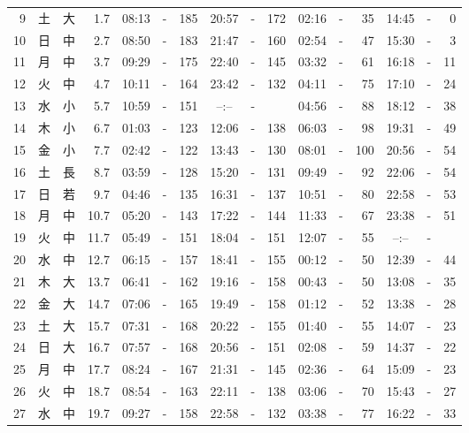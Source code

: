 \documentclass[12pt.a4j]{jsarticle}
\begin{document}
\begin{center}
\begin{table}[ht]
\begin{tabular}{|rc|cr|ccrccr|ccrccr|}
 9 & 土 & 大 &  1.7 &  08:13 &-& 185  &  20:57 &-& 172  &   02:16 &-&  35  &   14:45 &-&   0  \\
10 & 日 & 中 &  2.7 &  08:50 &-& 183  &  21:47 &-& 160  &   02:54 &-&  47  &   15:30 &-&   3  \\
11 & 月 & 中 &  3.7 &  09:29 &-& 175  &  22:40 &-& 145  &   03:32 &-&  61  &   16:18 &-&  11  \\
12 & 火 & 中 &  4.7 &  10:11 &-& 164  &  23:42 &-& 132  &   04:11 &-&  75  &   17:10 &-&  24  \\
13 & 水 & 小 &  5.7 &  10:59 &-& 151  &  --:-- &-&     &   04:56 &-&  88  &   18:12 &-&  38  \\
14 & 木 & 小 &  6.7 &  01:03 &-& 123  &  12:06 &-& 138  &   06:03 &-&  98  &   19:31 &-&  49  \\
15 & 金 & 小 &  7.7 &  02:42 &-& 122  &  13:43 &-& 130  &   08:01 &-& 100  &   20:56 &-&  54  \\
16 & 土 & 長 &  8.7 &  03:59 &-& 128  &  15:20 &-& 131  &   09:49 &-&  92  &   22:06 &-&  54  \\
17 & 日 & 若 &  9.7 &  04:46 &-& 135  &  16:31 &-& 137  &   10:51 &-&  80  &   22:58 &-&  53  \\
18 & 月 & 中 & 10.7 &  05:20 &-& 143  &  17:22 &-& 144  &   11:33 &-&  67  &   23:38 &-&  51  \\
19 & 火 & 中 & 11.7 &  05:49 &-& 151  &  18:04 &-& 151  &   12:07 &-&  55  &   --:-- &-&     \\
20 & 水 & 中 & 12.7 &  06:15 &-& 157  &  18:41 &-& 155  &   00:12 &-&  50  &   12:39 &-&  44  \\
21 & 木 & 大 & 13.7 &  06:41 &-& 162  &  19:16 &-& 158  &   00:43 &-&  50  &   13:08 &-&  35  \\
22 & 金 & 大 & 14.7 &  07:06 &-& 165  &  19:49 &-& 158  &   01:12 &-&  52  &   13:38 &-&  28  \\
23 & 土 & 大 & 15.7 &  07:31 &-& 168  &  20:22 &-& 155  &   01:40 &-&  55  &   14:07 &-&  23  \\
24 & 日 & 大 & 16.7 &  07:57 &-& 168  &  20:56 &-& 151  &   02:08 &-&  59  &   14:37 &-&  22  \\
25 & 月 & 中 & 17.7 &  08:24 &-& 167  &  21:31 &-& 145  &   02:36 &-&  64  &   15:09 &-&  23  \\
26 & 火 & 中 & 18.7 &  08:54 &-& 163  &  22:11 &-& 138  &   03:06 &-&  70  &   15:43 &-&  27  \\
27 & 水 & 中 & 19.7 &  09:27 &-& 158  &  22:58 &-& 132  &   03:38 &-&  77  &   16:22 &-&  33  \\

\end{tabular}
\end{table}
\end{center}
\end{document}

